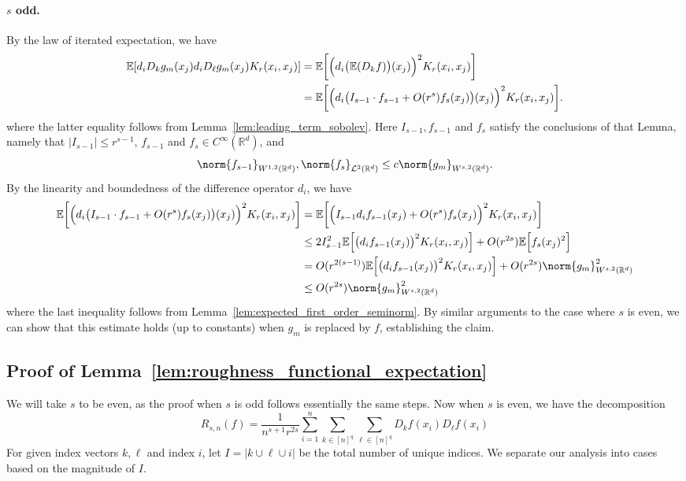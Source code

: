 \documentclass{article}
\newcommand{\Reals}{\mathbb{R}}
\newcommand{\abs}[1]{\left \lvert #1 \right \rvert}
\newcommand{\1}{\mathbf{1}}
\newcommand{\Rd}{\Reals^d}
\newcommand{\Leb}{\mathcal{L}}
\newcommand{\Ebb}{\mathbb{E}}
\theoremstyle{alden}
\theoremstyle{aldenthm}
\theoremstyle{definition}
\theoremstyle{remark}
\begin{document}
\paragraph{$s$ odd.}

By the law of iterated expectation, we have
\begin{align*}
\Ebb[d_iD_kg_m(x_j)d_iD_{\ell}g_m(x_j)K_r(x_i,x_j)] & = \Ebb\biggl[\Bigl(d_i\bigl(\Ebb(D_kf)\bigr)(x_j)\Bigr)^2K_r(x_i,x_j)\biggr] \\
& = \Ebb\biggl[\Bigl(d_i\bigl(I_{s - 1}\cdot f_{s - 1} + O(r^s)f_s(x_j)\bigr)(x_j)\Bigr)^2K_r(x_i,x_j)\biggr].
\end{align*}
where the latter equality follows from Lemma~\ref{lem:leading_term_sobolev}. Here $I_{s - 1}, f_{s -1}$ and $f_s$ satisfy the conclusions of that Lemma, namely that $\abs{I_{s - 1}} \leq r^{s - 1}$, $f_{s - 1}$ and $f_s \in C^{\infty}(\Rd)$, and
\begin{equation*}
\norm{f_{s - 1}}_{W^{1,2}(\Rd)}, \norm{f_s}_{\Leb^2(\Rd)} \leq c \norm{g_m}_{W^{s,2}(\Rd)}.
\end{equation*}
By the linearity and boundedness of the difference operator $d_i$, we have
\begin{align*}
\Ebb\biggl[\Bigl(d_i\bigl(I_{s - 1}\cdot f_{s - 1} + O(r^s)f_s(x_j)\bigr)(x_j)\Bigr)^2K_r(x_i,x_j)\biggr] & = \Ebb\biggl[\Bigl(I_{s - 1} d_if_{s - 1}(x_j) + O(r^s)f_s(x_j)\Bigr)^2K_r(x_i,x_j)\biggr] \\
& \leq 2I_{s - 1}^2 \Ebb\Bigl[\bigl(d_if_{s-1}(x_j)\bigr)^2K_r(x_i,x_j)\Bigr] + O(r^{2s})\Ebb\Bigl[f_s(x_j)^2\Bigr] \\
& = O(r^{2(s - 1)})\Ebb\Bigl[\bigl(d_if_{s-1}(x_j)\bigr)^2K_r(x_i,x_j)\Bigr] + O(r^{2s}) \norm{g_m}_{W^{s,2}(\Rd)}^2 \\
& \leq O(r^{2s}) \norm{g_m}_{W^{s,2}(\Rd)}^2
\end{align*}
where the last inequality follows from Lemma~\ref{lem:expected_first_order_seminorm}.
By similar arguments to the case where $s$ is even, we can show that this estimate holds (up to constants) when $g_m$ is replaced by $f$, establishing the claim.

\subsection{Proof of Lemma~\ref{lem:roughness_functional_expectation}}
We will take $s$ to be even, as the proof when $s$ is odd follows essentially the same steps. Now when $s$ is even, we have the decomposition
\begin{equation*}
R_{s,n}(f) = \frac{1}{n^{s+1}r^{2s}} \sum_{i = 1}^{n} \sum_{k \in [n]^q} \sum_{\ell \in [n]^q} D_kf(x_i) D_{\ell}f(x_i)
\end{equation*}
For given index vectors $k,\ell$ and index $i$, let $I = \abs{k \cup \ell \cup i}$ be the total number of unique indices. We separate our analysis into cases based on the magnitude of $I$. 
\end{document}
